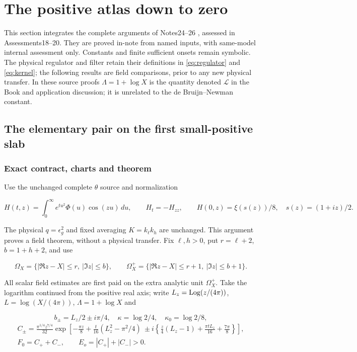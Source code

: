 \section{The positive atlas down to zero}
\label{sec:positive-bridges}
This section integrates the complete arguments of Notes24--26
\cite{ansatz24,ansatz25,ansatz26}, assessed in Assessments18--20.
They are proved in-note from named inputs, with same-model internal
assessment only. Constants and finite sufficient onsets remain symbolic.
The physical regulator and filter retain their definitions in
\eqref{eq:regulator} and \eqref{eq:kernel}; the following results are
field comparisons, prior to any new physical transfer. In these
source proofs $\Lambda=1+\log X$ is the quantity denoted
$\mathcal L$ in the Book and application discussion; it is unrelated
to the de Bruijn--Newman constant.

\subsection{The elementary pair on the first small-positive slab}
\label{sec:small-positive-slab}
\subsubsection{Exact contract, charts and theorem}
\label{subsec:sp-1}

Use the unchanged complete \(\theta\) source and normalization

\[
H(t,z)=\int_0^\infty e^{tu^2}\Phi(u)\cos(zu)\,du,
\qquad H_t=-H_{zz},\qquad H(0,z)=\xi(s(z))/8,
\quad s(z)=(1+iz)/2.
\tag{SP1}\label{eq:ansatz-sp1}
\]

The physical \(q=\epsilon_{g}^{2}\) and fixed averaging \(K=k_{\ell} k_{h}\) are unchanged. This argument proves a field theorem, without a physical transfer. Fix \(\ell,h>0\), put \(r=\ell+2\), \(b=1+h+2\), and use

\[
\Omega_X=\{|\Re z-X|\le r,\ |\Im z|\le b\},\qquad
\Omega_X^+=\{|\Re z-X|\le r+1,\ |\Im z|\le b+1\}.
\tag{SP2}\label{eq:ansatz-sp2}
\]

All scalar field estimates are first paid on the extra analytic unit \(\Omega_{X}^+\). Take the logarithm continued from the positive real axis; write \(L_{z}=\operatorname{Log}(z/(4\pi))\), \(L=\log(X/(4\pi))\), \(\Lambda=1+\log X\) and

\[
b_\pm=L_z/2\pm i\pi/4,\quad \kappa=\log2/4,\quad
\kappa_0=\log2/8,
\]
\[
\begin{gathered}
C_\pm=\frac{\pi^{1/4}z^{7/4}}{32}
\exp\left[-\frac{\pi z}{8}
 +\frac t{16}(L_z^2-\pi^2/4)
 \ \pm i\left\{\frac z4(L_z-1)+\frac{\pi tL_z}{16}
                    +\frac{7\pi}{8}\right\}\right],
\\ F_0=C_++C_-,\qquad E_o=|C_+|+|C_-|>0.
\end{gathered}\tag{SP3}\label{eq:ansatz-sp3}
\]

